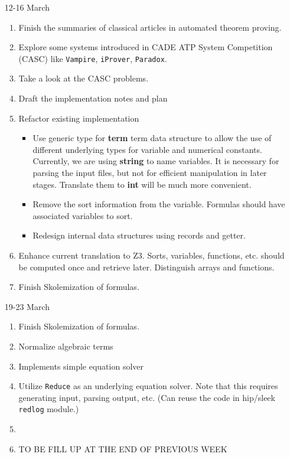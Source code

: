 \documentclass{article}
\begin{document}
\begin{enumerate}

\item [12-16 March]

\begin{enumerate}
\item Finish the summaries of classical articles in automated theorem proving.
\item Explore some systems introduced in CADE ATP System Competition (CASC) like \texttt{Vampire}, \texttt{iProver}, \texttt{Paradox}.
\item Take a look at the CASC problems.
\item Draft the implementation notes and plan
\item Refactor existing implementation
\begin{itemize}
\item Use generic type for \textbf{term} term data structure to allow the use of different underlying types for variable and numerical constants.\\
Currently, we are using \textbf{string} to name variables. It is necessary for parsing the input files, but not for efficient manipulation in later stages. Translate them to \textbf{int} will be much more convenient.
\item Remove the sort information from the variable. Formulas should have associated variables to sort.
\item Redesign internal data structures using records and getter.
\end{itemize}
\item Enhance current translation to Z3. Sorts, variables, functions, etc. should be computed once and retrieve later. Distinguish arrays and functions.
\item Finish Skolemization of formulas.
\end{enumerate}

\item [19-23 March]

\begin{enumerate}
\item Finish Skolemization of formulas.
\item Normalize algebraic  terms
\item Implements simple equation solver
\item Utilize \texttt{Reduce} as an underlying equation solver. Note that this requires generating input, parsing output, etc. (Can reuse the code in hip/sleek \texttt{redlog} module.)
\item 
\item TO BE FILL UP AT THE END OF PREVIOUS WEEK
\end{enumerate}


\end{enumerate}
\end{document}
